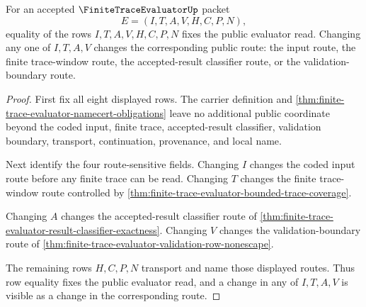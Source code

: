 \begin{theorem}
\label{thm:finite-trace-evaluator-field-faithful-rows}
For an accepted $\FiniteTraceEvaluatorUp$ packet
$$
E=(I,T,A,V,H,C,P,N),
$$
equality of the rows $I,T,A,V,H,C,P,N$ fixes the public evaluator read. Changing
any one of $I,T,A,V$ changes the corresponding public route: the input route,
the finite trace-window route, the accepted-result classifier route, or the
validation-boundary route.
\end{theorem}
\begin{proof}
First fix all eight displayed rows. The carrier definition and
\autoref{thm:finite-trace-evaluator-namecert-obligations} leave no additional
public coordinate beyond the coded input, finite trace, accepted-result
classifier, validation boundary, transport, continuation, provenance, and
local name.

Next identify the four route-sensitive fields. Changing $I$ changes the coded
input route before any finite trace can be read. Changing $T$ changes the
finite trace-window route controlled by
\autoref{thm:finite-trace-evaluator-bounded-trace-coverage}.

Changing $A$ changes the accepted-result classifier route of
\autoref{thm:finite-trace-evaluator-result-classifier-exactness}. Changing
$V$ changes the validation-boundary route of
\autoref{thm:finite-trace-evaluator-validation-row-nonescape}.

The remaining rows $H,C,P,N$ transport and name those displayed routes. Thus
row equality fixes the public evaluator read, and a change in any of
$I,T,A,V$ is visible as a change in the corresponding route.
\end{proof}

